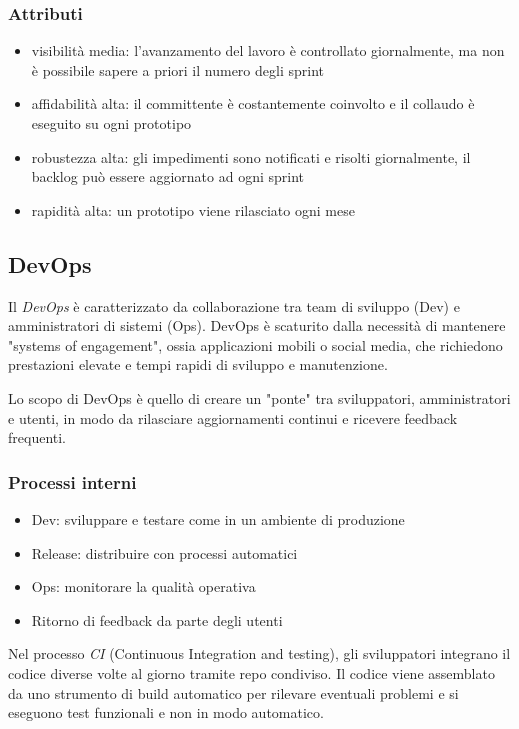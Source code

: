 \documentclass[11pt]{article}
\begin{document}
\subsubsection*{Attributi}
\begin{itemize}
    \item visibilità media: l'avanzamento del lavoro è controllato giornalmente, ma non è possibile sapere a priori il 
    numero degli sprint  
    \item affidabilità alta: il committente è costantemente coinvolto e il collaudo è eseguito su ogni prototipo
    \item robustezza alta: gli impedimenti sono notificati e risolti giornalmente, il backlog può essere aggiornato ad 
    ogni sprint
    \item rapidità alta: un prototipo viene rilasciato ogni mese
\end{itemize}
\subsection{DevOps}
Il \textit{DevOps} è caratterizzato da collaborazione tra team di sviluppo (Dev) e amministratori di sistemi (Ops). 
DevOps è scaturito dalla necessità di mantenere "systems of engagement", ossia applicazioni mobili o social media, che 
richiedono prestazioni elevate e tempi rapidi di sviluppo e manutenzione.

Lo scopo di DevOps è quello di creare un "ponte" tra sviluppatori, amministratori e utenti, in modo da rilasciare aggiornamenti 
continui e ricevere feedback frequenti.
\subsubsection*{Processi interni}
\begin{itemize}
    \item Dev: sviluppare e testare come in un ambiente di produzione
    \item Release: distribuire con processi automatici 
    \item Ops: monitorare la qualità operativa 
    \item Ritorno di feedback da parte degli utenti 
\end{itemize}

Nel processo \textit{CI} (Continuous Integration and testing), gli sviluppatori integrano il codice diverse volte al giorno
tramite repo condiviso. Il codice viene assemblato da uno strumento di build automatico per rilevare eventuali problemi 
e si eseguono test funzionali e non in modo automatico.
\end{document}
